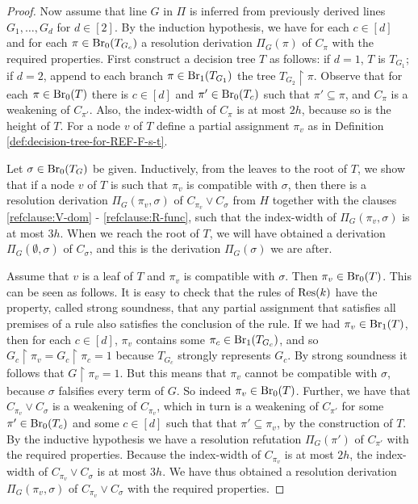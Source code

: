 \documentclass[10pt,a4paper]{article}
\theoremstyle{remark}
\newtheorem*{switching lemma}{Switching Lemma}
\newtheorem*{open problem}{Open Problem}
\theoremstyle{definition}
\begin{document}
\begin{proof}
Now assume that line $G$ in $\Pi$ is inferred from previously derived lines $G_1, \ldots, G_d$ for $d \in [2]$. By the induction hypothesis, we have for each $c \in [d]$ and for each  $\pi \in \textnormal{Br}_0(T_{G_c})$ a resolution derivation $\Pi_G(\pi)$ of $C_{\pi}$ with the required properties. First construct a decision tree $T$ as follows: if $d=1$, $T$ is $T_{G_1}$; if $d=2$, append to each branch $\pi \in \textnormal{Br}_1(T_{G_1})$ the tree $T_{G_2} \! \restriction \! \pi$. Observe that for each $\pi \in \textnormal{Br}_0(T)$ there is $c \in [d]$ and $\pi' \in \textnormal{Br}_0(T_c)$ such that $\pi' \subseteq \pi$, and  $C_{\pi}$ is a weakening of $C_{\pi'}$. Also, the index-width of $C_{\pi}$ is at most $2h$, because so is the height of $T$. 
For a node $v$ of $T$ define a partial assignment $\pi_v$ as in Definition \ref{def:decision-tree-for-REF-F-s-t}.

Let $\sigma \in \textnormal{Br}_0(T_G)$ be given. Inductively, from the leaves to the root of $T$, we show that if a node $v$ of $T$ is such that $\pi_v$ is compatible with $\sigma$, then there is a resolution derivation $\Pi_G(\pi_v, \sigma)$ of $C_{\pi_v} \lor C_{\sigma}$ from $H$ together with the clauses \eqref{refclause:V-dom} - \eqref{refclause:R-func}, such that the index-width of $\Pi_G(\pi_v, \sigma)$ is at most $3h$. When we reach the root of $T$, we will have obtained a derivation $\Pi_G(\emptyset, \sigma)$ of $C_{\sigma}$, and this is the derivation $\Pi_G(\sigma)$ we are after.

Assume that $v$ is a leaf of $T$ and $\pi_v$ is compatible with $\sigma$. Then $\pi_v \in \textnormal{Br}_0(T)$. This can be seen as follows. It is easy to check that the rules of $\textnormal{Res}(k)$ have the property, called strong soundness, that any partial assignment that satisfies all premises of a rule also satisfies the conclusion of the rule. If we had $\pi_v \in \textnormal{Br}_1(T)$, then for each $c \in [d]$, $\pi_v$ contains some $\pi_c \in \textnormal{Br}_1(T_{G_c})$, and so $G_c \! \restriction \! \pi_v = G_c \! \restriction \! \pi_c = 1$ because $T_{G_c}$ strongly represents $G_c$. By strong soundness it follows that $G \! \restriction \! \pi_v = 1$. But this means that $\pi_v$ cannot be compatible with $\sigma$, because $\sigma$ falsifies every term of $G$. So indeed $\pi_v \in \textnormal{Br}_0(T)$. Further, we have that $C_{\pi_v} \lor C_{\sigma}$ is a weakening of $C_{\pi_v}$, which in turn is a weakening of $C_{\pi'}$ for some $\pi' \in \textnormal{Br}_0(T_c)$ and some $c \in [d]$ such that that $\pi' \subseteq \pi_v$, by the construction of $T$. By the inductive hypothesis we have a resolution refutation $\Pi_G(\pi')$ of $C_{\pi'}$ with the required properties.  Because the index-width of $C_{\pi_v}$ is at most $2h$, the index-width of $C_{\pi_v} \lor C_{\sigma}$ is at most $3h$. We have thus obtained a resolution derivation $\Pi_G(\pi_v, \sigma)$ of $C_{\pi_v} \lor C_{\sigma}$ with the required properties.


\end{proof}
\end{document}
